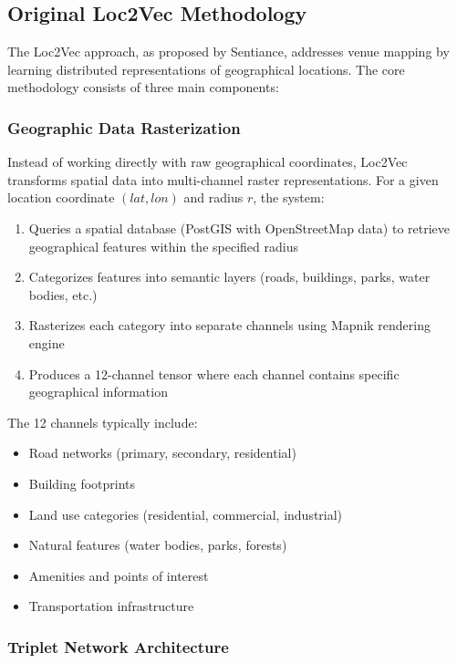 \subsection{Original Loc2Vec Methodology}

The Loc2Vec approach, as proposed by Sentiance, addresses venue mapping by learning distributed representations of geographical locations. The core methodology consists of three main components:

\subsubsection{Geographic Data Rasterization}

Instead of working directly with raw geographical coordinates, Loc2Vec transforms spatial data into multi-channel raster representations. For a given location coordinate $(lat, lon)$ and radius $r$, the system:

\begin{enumerate}
    \item Queries a spatial database (PostGIS with OpenStreetMap data) to retrieve geographical features within the specified radius
    \item Categorizes features into semantic layers (roads, buildings, parks, water bodies, etc.)
    \item Rasterizes each category into separate channels using Mapnik rendering engine
    \item Produces a 12-channel tensor where each channel contains specific geographical information
\end{enumerate}

The 12 channels typically include:
\begin{itemize}
    \item Road networks (primary, secondary, residential)
    \item Building footprints
    \item Land use categories (residential, commercial, industrial)
    \item Natural features (water bodies, parks, forests)
    \item Amenities and points of interest
    \item Transportation infrastructure
\end{itemize}

\subsubsection{Triplet Network Architecture}

